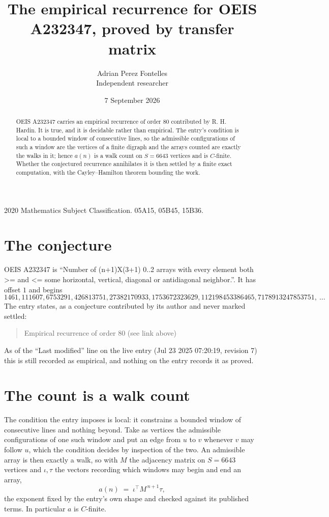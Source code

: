 \documentclass[11pt,a4paper]{article}
\title{The empirical recurrence for OEIS A232347, proved by transfer matrix}
\author{Adrian Perez Fontelles\\ \small Independent researcher}
\date{7 September 2026}
\theoremstyle{plain}
\theoremstyle{definition}
\begin{document}
\maketitle

\begin{abstract}
OEIS A232347 carries an empirical recurrence of order $80$ contributed by R. H. Hardin. It is
true, and it is decidable rather than empirical. The entry's condition is local to a bounded window of consecutive lines, so
the admissible configurations of such a window are the vertices of a finite digraph and the
arrays counted are exactly the walks in it; hence $a(n)$ is a walk count on $S=6643$ vertices
and is $C$-finite. Whether the conjectured recurrence annihilates it is then settled by a
finite exact computation, with the Cayley--Hamilton theorem bounding the work.
\end{abstract}

\noindent\small 2020 Mathematics Subject Classification. 05A15, 05B45, 15B36.\normalsize

\section{The conjecture}

OEIS A232347 is ``Number of (n+1)X(3+1) 0..2 arrays with every element both >= and <= some horizontal, vertical, diagonal or antidiagonal neighbor.''. It has offset $1$ and begins
\[
1461, 111607, 6753291, 426813751, 27382170933, 1753672323629, 112198453386465, 7178913247853751,\ \dots
\]
The entry states, as a conjecture contributed by its author and never marked settled:
\begin{quote}
Empirical recurrence of order 80 (see link above)
\end{quote}
As of the ``Last modified'' line on the live entry (Jul 23 2025 07:20:19, revision 7) this is still
recorded as empirical, and nothing on the entry records it as proved.

\section{The count is a walk count}

The condition the entry imposes is local: it constrains a bounded window of consecutive lines and nothing beyond. Take as
vertices the admissible configurations of one such window and put an edge from $u$ to $v$
whenever $v$ may follow $u$, which the condition decides by inspection of the two. An
admissible array is then exactly a walk, so with $M$ the adjacency matrix on $S=6643$ vertices
and $\iota,\tau$ the vectors recording which windows may begin and end an array,
\[
a(n)\;=\;\iota^{\!\top}M^{\,n+1}\tau ,
\]
the exponent fixed by the entry's own shape and checked against its published terms. In
particular $a$ is $C$-finite.
\end{document}
